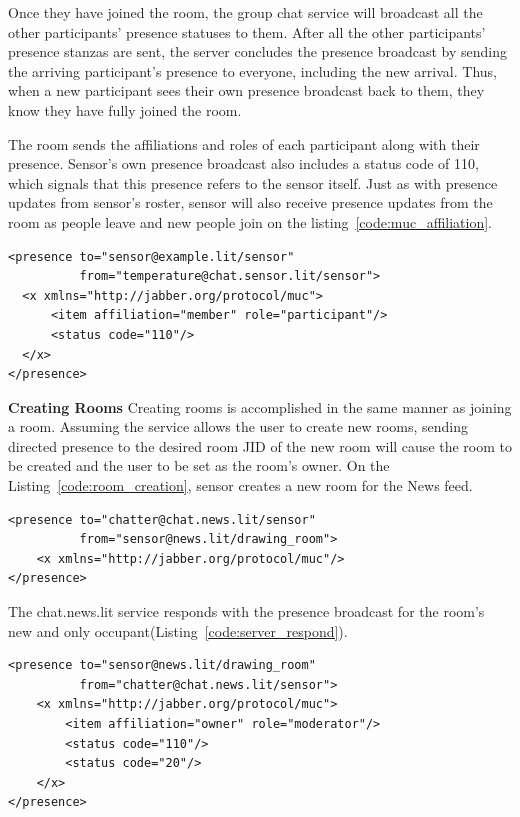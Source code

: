 Once they have joined the room, the group chat service will broadcast all the other participants' presence statuses to them. After all the other participants’ presence stanzas are sent, the server concludes the presence broadcast by sending the arriving participant’s presence to everyone, including the new arrival. Thus, when a new participant sees their own presence broadcast back to them, they know they have fully joined the room.

The room sends the affiliations and roles of each participant along with their presence. Sensor's own presence broadcast also includes a status code of 110, which signals that this presence refers to the sensor itself. Just as with presence updates from sensor's roster, sensor will also receive presence updates from the room as people leave and new people join on the listing~\ref{code:muc_affiliation}.
\begin{lstlisting}[label=code:muc_affiliation,caption=Server Presence Notification]
<presence to="sensor@example.lit/sensor"
          from="temperature@chat.sensor.lit/sensor">
  <x xmlns="http://jabber.org/protocol/muc">
      <item affiliation="member" role="participant"/>
      <status code="110"/>
  </x>
</presence>
\end{lstlisting}

\textbf{Creating Rooms}
\newline
Creating rooms is accomplished in the same manner as joining a room. Assuming the service allows the user to create new rooms, sending directed presence to the desired room JID of the new room will cause the room to be created and the user to be set as the room’s owner. On the Listing~\ref{code:room_creation}, sensor creates a new room for the News feed.

	\begin{lstlisting}[label=code:room_creation,caption=MUC Room Creation]
<presence to="chatter@chat.news.lit/sensor"
          from="sensor@news.lit/drawing_room">
    <x xmlns="http://jabber.org/protocol/muc"/>
</presence>
	\end{lstlisting}

The chat.news.lit service responds with the presence broadcast for the room’s new and only occupant(Listing~\ref{code:server_respond}).

	\begin{lstlisting}[label=code:server_respond,caption=Server Respond to Room Creation]
<presence to="sensor@news.lit/drawing_room"
          from="chatter@chat.news.lit/sensor">
    <x xmlns="http://jabber.org/protocol/muc">
        <item affiliation="owner" role="moderator"/>
        <status code="110"/>
        <status code="20"/>
    </x>
</presence>
		\end{lstlisting}

